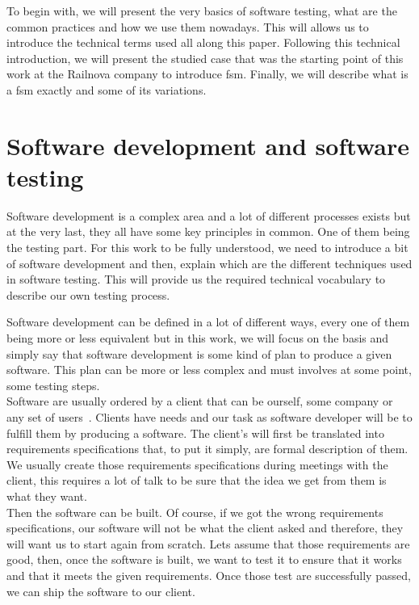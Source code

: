 \documentclass[12pt]{article}
\theoremstyle{definition}
\theoremstyle{definition}
\begin{document}
To begin with, we will present the very basics of software testing, what are the common practices and how we use them nowadays. This will allows us to introduce the technical terms used all along this paper. Following this technical introduction, we will present the studied case that was the starting point of this work at the Railnova company to introduce \gls{fsm}. Finally, we will describe what is a \gls{fsm} exactly and some of its variations.

\clearpage
\section{Software development and software testing}

Software development is a complex area and a lot of different processes exists but at the very last, they all have some key principles in common. One of them being the testing part. For this work to be fully understood, we need to introduce a bit of software development and then, explain which are the different techniques used in software testing. This will provide us the required technical vocabulary to describe our own testing process.

Software development can be defined in a lot of different ways, every one of them being more or less equivalent but in this work, we will focus on the basis and simply say that software development is some kind of plan to produce a given software. This plan can be more or less complex and must involves at some point, some testing steps.\\

Software are usually ordered by a client that can be ourself, some company or any set of users~\cite{SoftwareDevelopment:2016}. Clients have needs and our task as software developer will be to fulfill them by producing a software. The client's will first be translated into requirements specifications that, to put it simply, are formal description of them. We usually create those requirements specifications during meetings with the client, this requires a lot of talk to be sure that the idea we get from them is what they want.\\

Then the software can be built. Of course, if we got the wrong requirements specifications, our software will not be what the client asked and therefore, they will want us to start again from scratch. Lets assume that those requirements are good, then, once the software is built, we want to test it to ensure that it works and that it meets the given requirements. Once those test are successfully passed, we can ship the software to our client.\\
\end{document}
